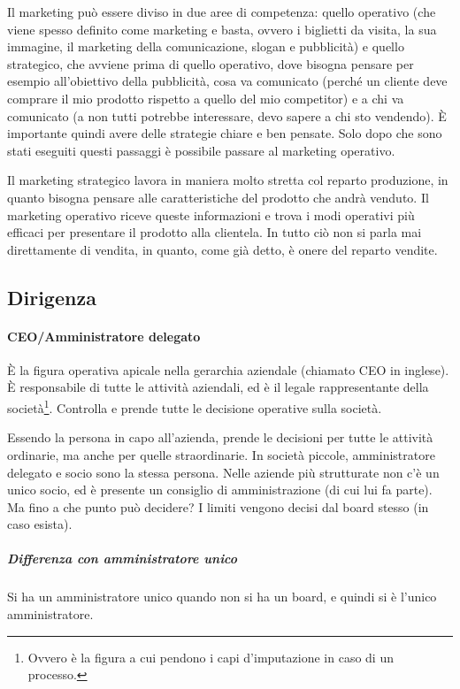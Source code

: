 Il marketing può essere diviso in due aree di competenza: quello operativo (che
viene spesso definito come marketing e basta, ovvero i biglietti da visita, la
sua immagine, il marketing della comunicazione, slogan e pubblicità) e
quello strategico, che avviene prima di quello operativo, dove bisogna pensare
per esempio all'obiettivo della pubblicità, cosa va comunicato (perché un
cliente deve comprare il mio prodotto rispetto a quello del mio competitor) e a
chi va comunicato (a non tutti potrebbe interessare, devo sapere a chi sto
vendendo). È importante quindi avere delle strategie chiare e ben pensate. Solo
dopo che sono stati eseguiti questi passaggi è possibile passare al marketing
operativo.

Il marketing strategico lavora in maniera molto stretta col reparto produzione,
in quanto bisogna pensare alle caratteristiche del prodotto che andrà venduto.
Il marketing operativo riceve queste informazioni e trova i modi operativi più
efficaci per presentare il prodotto alla clientela. In tutto ciò non si parla
mai direttamente di vendita, in quanto, come già detto, è onere del reparto
vendite.

\subsection{Dirigenza}

\paragraph*{CEO/Amministratore delegato} È la figura operativa apicale nella
gerarchia aziendale (chiamato CEO in inglese). È responsabile di tutte le
attività aziendali, ed è il legale rappresentante della società\footnote{Ovvero
è la figura a cui pendono i capi d'imputazione in caso di un processo.}.
Controlla e prende tutte le decisione operative sulla società.

Essendo la persona in capo all'azienda, prende le decisioni per tutte le
attività ordinarie, ma anche per quelle straordinarie. In società piccole,
amministratore delegato e socio sono la stessa persona. Nelle aziende più
strutturate non c'è un unico socio, ed è presente un consiglio di
amministrazione (di cui lui fa parte).
Ma fino a che punto può decidere? I limiti vengono decisi dal board stesso (in
caso esista).

\subparagraph*{Differenza con amministratore unico} Si ha un amministratore
unico quando non si ha un board, e quindi si è l'unico amministratore.


